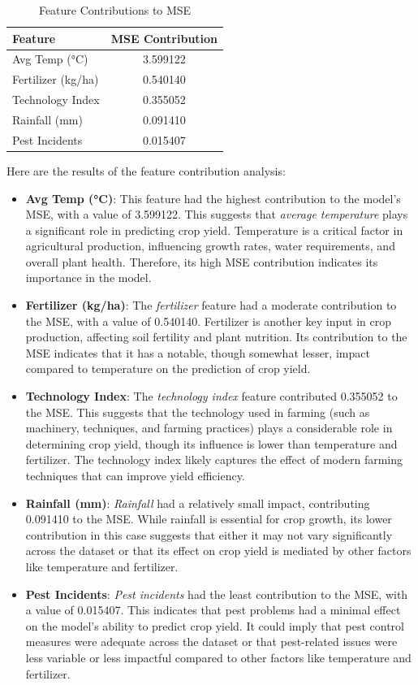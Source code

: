 \begin{table}[h!]
\centering
\begin{tabular}{|l|c|}
\hline
\textbf{Feature} & \textbf{MSE Contribution} \\
\hline
Avg Temp (°C) & 3.599122 \\
Fertilizer (kg/ha) & 0.540140 \\
Technology Index & 0.355052 \\
Rainfall (mm) & 0.091410 \\
Pest Incidents & 0.015407 \\
\hline
\end{tabular}
\caption{Feature Contributions to MSE}
\end{table}

Here are the results of the feature contribution analysis:

\begin{itemize}
    \item \textbf{Avg Temp (°C)}: This feature had the highest contribution to the model's MSE, with a value of 3.599122. This suggests that \textit{average temperature} plays a significant role in predicting crop yield. Temperature is a critical factor in agricultural production, influencing growth rates, water requirements, and overall plant health. Therefore, its high MSE contribution indicates its importance in the model.
    \item \textbf{Fertilizer (kg/ha)}: The \textit{fertilizer} feature had a moderate contribution to the MSE, with a value of 0.540140. Fertilizer is another key input in crop production, affecting soil fertility and plant nutrition. Its contribution to the MSE indicates that it has a notable, though somewhat lesser, impact compared to temperature on the prediction of crop yield.
    \item \textbf{Technology Index}: The \textit{technology index} feature contributed 0.355052 to the MSE. This suggests that the technology used in farming (such as machinery, techniques, and farming practices) plays a considerable role in determining crop yield, though its influence is lower than temperature and fertilizer. The technology index likely captures the effect of modern farming techniques that can improve yield efficiency.
    \item \textbf{Rainfall (mm)}: \textit{Rainfall} had a relatively small impact, contributing 0.091410 to the MSE. While rainfall is essential for crop growth, its lower contribution in this case suggests that either it may not vary significantly across the dataset or that its effect on crop yield is mediated by other factors like temperature and fertilizer.
    \item \textbf{Pest Incidents}: \textit{Pest incidents} had the least contribution to the MSE, with a value of 0.015407. This indicates that pest problems had a minimal effect on the model's ability to predict crop yield. It could imply that pest control measures were adequate across the dataset or that pest-related issues were less variable or less impactful compared to other factors like temperature and fertilizer.
\end{itemize}

